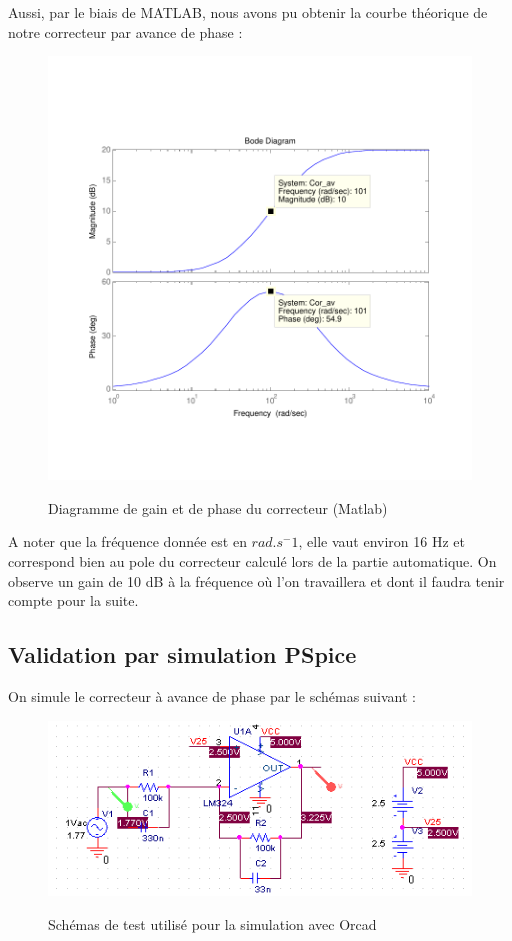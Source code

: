 \documentclass[11pt, french]{article} %
\begin{document}
Aussi, par le biais de MATLAB, nous avons pu obtenir la courbe théorique de notre correcteur par avance de phase :

\begin{figure}[!h]
    \centering
	\includegraphics[scale = 0.8]{SolutionAnalogique/BodeAvPhase.pdf} 
	\label{avph_bode}
	\caption{Diagramme de gain et de phase du correcteur (Matlab)}
\end{figure}


A noter que la fréquence donnée est en $rad.s^-1$, elle vaut environ 16 Hz et correspond bien au pole du correcteur calculé lors de la partie automatique. On observe un gain de 10 dB à la fréquence où l'on travaillera et dont il faudra tenir compte pour la suite. 



\subsection{Validation par simulation PSpice}

On simule le correcteur à avance de phase par le schémas suivant : 

\begin{figure}[!h]
    \centering
	\includegraphics[scale = 0.8]{SolutionAnalogique/orcad_sch.png} 
	\label{avph_schm_simu}
	\caption{Schémas de test utilisé pour la simulation avec Orcad}
\end{figure}
\end{document}
